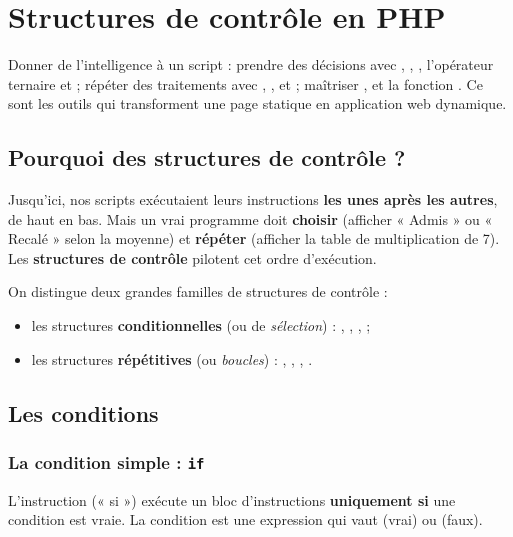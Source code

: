\chapter{Structures de contrôle en PHP}

\begin{synthese}[Au programme]
Donner de l'intelligence à un script : prendre des décisions avec ,
, , l'opérateur ternaire et  ; répéter des
traitements avec , ,  et  ;
maîtriser ,  et la fonction . Ce sont les
outils qui transforment une page statique en application web dynamique.
\end{synthese}

\section{Pourquoi des structures de contrôle ?}

Jusqu'ici, nos scripts exécutaient leurs instructions \textbf{les unes après les
autres}, de haut en bas. Mais un vrai programme doit \textbf{choisir} (afficher
« Admis » ou « Recalé » selon la moyenne) et \textbf{répéter} (afficher la table de
multiplication de 7). Les \textbf{structures de contrôle} pilotent cet ordre
d'exécution.

\begin{definition}
On distingue deux grandes familles de structures de contrôle :
\begin{itemize}
  \item les structures \textbf{conditionnelles} (ou de \emph{sélection}) :
        , , ,  ;
  \item les structures \textbf{répétitives} (ou \emph{boucles}) : ,
        , , .
\end{itemize}
\end{definition}

\section{Les conditions}

\subsection{La condition simple : \texttt{if}}

\begin{definition}
L'instruction  (« si ») exécute un bloc d'instructions \textbf{uniquement
si} une condition est vraie. La condition est une expression qui vaut 
(vrai) ou  (faux).
\end{definition}

